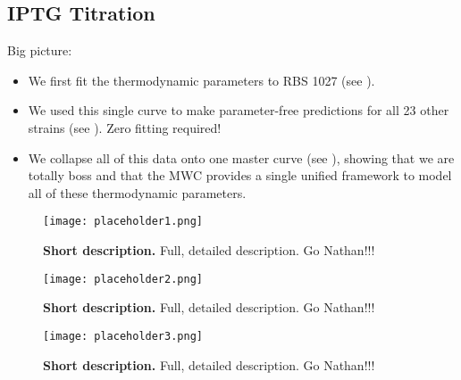 \pagebreak
\subsection*{IPTG Titration }

Big picture: 
\begin{itemize}
	\item We first fit the thermodynamic parameters to RBS 1027 (see \fref[figNathanChooseDescriptionHere1]).
	\item We used this single curve to make parameter-free predictions for all 23 other strains (see \fref[figNathanChooseDescriptionHere2]). Zero fitting required!
	\item We collapse all of this data onto one master curve (see \fref[figNathanChooseDescriptionHere3]), showing that we are totally boss and that the MWC provides a single unified framework to model all of these thermodynamic parameters.
\end{itemize}

\begin{figure}[h]
	\centering \texttt{[image: placeholder1.png]}
	\caption{{\bf Short description.} Full, detailed description. Go Nathan!!!}
	\label{figNathanChooseDescriptionHere1}
\end{figure}

\begin{figure}[h]
	\centering \texttt{[image: placeholder2.png]}
	\caption{{\bf Short description.} Full, detailed description. Go Nathan!!!}
	\label{figNathanChooseDescriptionHere2}
\end{figure}

\begin{figure}[h]
	\centering \texttt{[image: placeholder3.png]}
	\caption{{\bf Short description.} Full, detailed description. Go Nathan!!!}
	\label{figNathanChooseDescriptionHere3}
\end{figure}